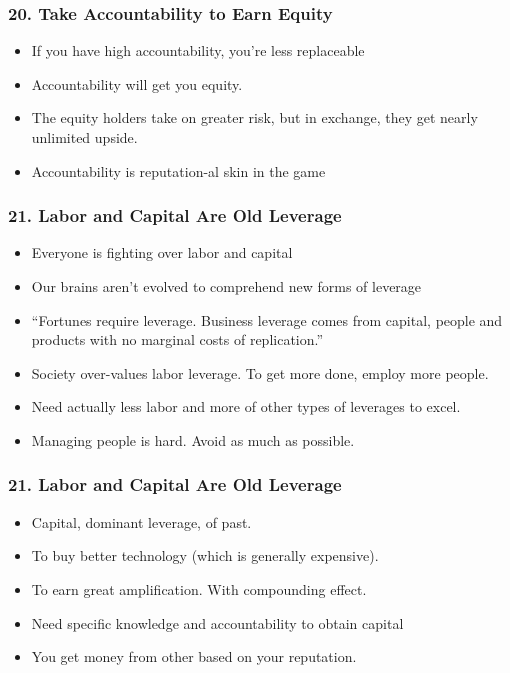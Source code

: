 \begin{frame}[fragile]
\frametitle{20. Take Accountability to Earn Equity}
\begin{itemize}
\item If you have high accountability, you're less replaceable
\item Accountability will get you equity.
\item The equity holders take on greater risk, but in exchange, they get nearly unlimited upside.
\item Accountability is reputation-al skin in the game
\end{itemize}
\end{frame}

\begin{frame}[fragile]
\frametitle{21. Labor and Capital Are Old Leverage}
\begin{itemize}
\item Everyone is fighting over labor and capital
\item Our brains aren't evolved to comprehend new forms of leverage
\item ``Fortunes require leverage. Business leverage comes from capital, people and products with no marginal costs of replication.''
\item Society over-values labor leverage. To get more done, employ more people.
\item Need actually less labor and more of other types of leverages to excel.
\item Managing people is hard. Avoid as much as possible.

\end{itemize}
\end{frame}

\begin{frame}[fragile]
\frametitle{21. Labor and Capital Are Old Leverage}
\begin{itemize}
\item Capital, dominant leverage, of past.
\item To buy better technology (which is generally expensive).
\item To earn great amplification. With compounding effect.
\item Need specific knowledge and accountability to obtain capital
\item You get money from other based on your reputation.

\end{itemize}
\end{frame}

